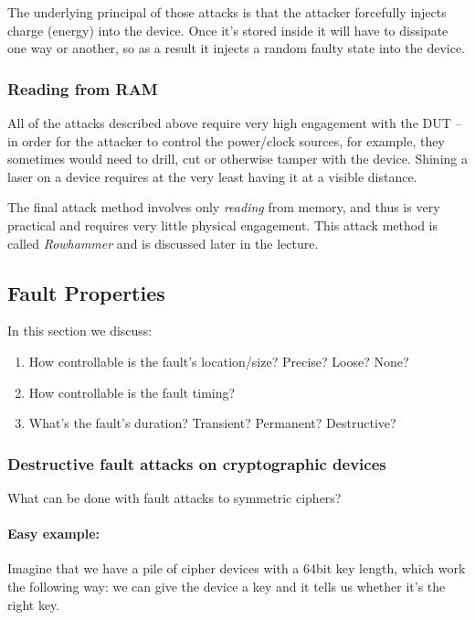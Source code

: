 The underlying principal of those attacks is that the attacker forcefully injects charge (energy) into the device. Once it's stored inside it will have to dissipate one way or another, so as a result it injects a random faulty state into the device.

\subsubsection{Reading from RAM}
All of the attacks described above require very high engagement with the DUT -- in order for the attacker to control the power/clock sources, for example, they sometimes would need to drill, cut or otherwise tamper with the device. Shining a laser on a device requires at the very least having it at a visible distance.

The final attack method involves only \emph{reading} from memory, and thus is very practical and requires very little physical engagement. This attack method is called \emph{Rowhammer} and is discussed later in the lecture.


\subsection{Fault Properties}
In this section we discuss:
\begin{enumerate}
	\item How controllable is the fault's location/size? Precise? Loose? None?
	\item How controllable is the fault timing?
	\item What's the fault's duration? Transient? Permanent? Destructive?
\end{enumerate}


\subsubsection*{Destructive fault attacks on cryptographic devices}
What can be done with fault attacks to symmetric ciphers?
\paragraph{Easy example:} Imagine that we have a pile of cipher devices with a 64bit key length, which work the following way: we can give the device a key and it tells us whether it's the right key.

